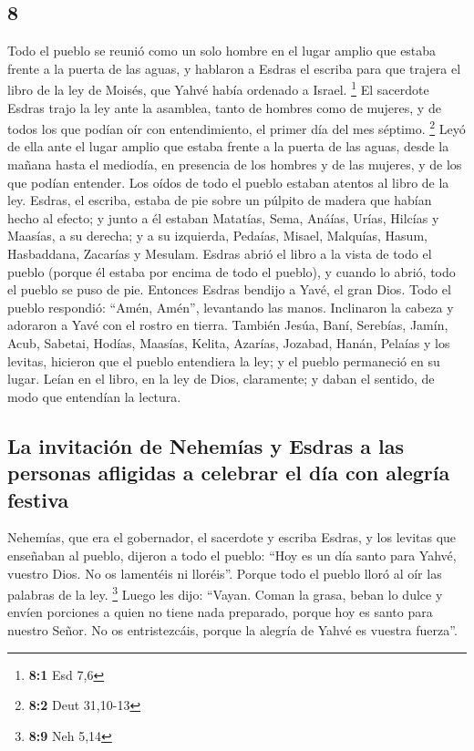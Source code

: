 \begin{paracol}{2}
\hypertarget{section-14}{%
\section{8}\label{section-14}}

 Todo el pueblo se reunió como un solo hombre en el lugar
amplio que estaba frente a la puerta de las aguas, y hablaron a Esdras
el escriba para que trajera el libro de la ley de Moisés, que Yahvé
había ordenado a Israel. \footnote{\textbf{8:1} Esd 7,6} 
El sacerdote Esdras trajo la ley ante la asamblea, tanto de hombres como
de mujeres, y de todos los que podían oír con entendimiento, el primer
día del mes séptimo. \footnote{\textbf{8:2} Deut 31,10-13}
 Leyó de ella ante el lugar amplio que estaba frente a la
puerta de las aguas, desde la mañana hasta el mediodía, en presencia de
los hombres y de las mujeres, y de los que podían entender. Los oídos de
todo el pueblo estaban atentos al libro de la ley. 
Esdras, el escriba, estaba de pie sobre un púlpito de madera que habían
hecho al efecto; y junto a él estaban Matatías, Sema, Anáías, Urías,
Hilcías y Maasías, a su derecha; y a su izquierda, Pedaías, Misael,
Malquías, Hasum, Hasbaddana, Zacarías y Mesulam.  Esdras
abrió el libro a la vista de todo el pueblo (porque él estaba por encima
de todo el pueblo), y cuando lo abrió, todo el pueblo se puso de pie.
 Entonces Esdras bendijo a Yavé, el gran Dios. Todo el
pueblo respondió: ``Amén, Amén'', levantando las manos. Inclinaron la
cabeza y adoraron a Yavé con el rostro en tierra.  También
Jesúa, Baní, Serebías, Jamín, Acub, Sabetai, Hodías, Maasías, Kelita,
Azarías, Jozabad, Hanán, Pelaías y los levitas, hicieron que el pueblo
entendiera la ley; y el pueblo permaneció en su lugar. 
Leían en el libro, en la ley de Dios, claramente; y daban el sentido, de
modo que entendían la lectura.

\hypertarget{la-invitaciuxf3n-de-nehemuxedas-y-esdras-a-las-personas-afligidas-a-celebrar-el-duxeda-con-alegruxeda-festiva}{%
\subsection{La invitación de Nehemías y Esdras a las personas afligidas
a celebrar el día con alegría
festiva}\label{la-invitaciuxf3n-de-nehemuxedas-y-esdras-a-las-personas-afligidas-a-celebrar-el-duxeda-con-alegruxeda-festiva}}

 Nehemías, que era el gobernador, el sacerdote y escriba
Esdras, y los levitas que enseñaban al pueblo, dijeron a todo el pueblo:
``Hoy es un día santo para Yahvé, vuestro Dios. No os lamentéis ni
lloréis''. Porque todo el pueblo lloró al oír las palabras de la ley.
\footnote{\textbf{8:9} Neh 5,14}  Luego les dijo:
``Vayan. Coman la grasa, beban lo dulce y envíen porciones a quien no
tiene nada preparado, porque hoy es santo para nuestro Señor. No os
entristezcáis, porque la alegría de Yahvé es vuestra fuerza''.


\end{paracol}
